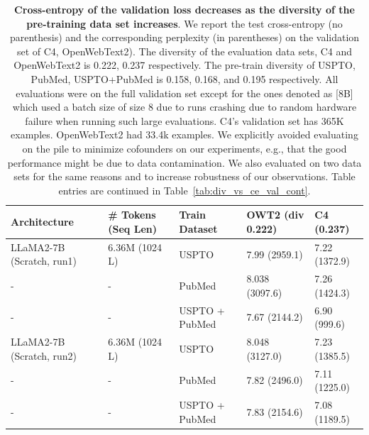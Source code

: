\begin{table}[h]
\caption{\textbf{Cross-entropy of the validation loss decreases as the diversity of the pre-training data set increases}. 
We report the test cross-entropy (no parenthesis) and the corresponding perplexity (in parentheses) on the validation set of C4, OpenWebText2).
The diversity of the evaluation data sets, C4 and OpenWebText2 is 0.222, 0.237 respectively. 
The pre-train diversity of USPTO, PubMed, USPTO+PubMed is 0.158, 0.168, and 0.195 respectively.
All evaluations were on the full validation set except for the ones denoted as [8B] which used a batch size of size 8 due to runs crashing due to random hardware failure when running such large evaluations. 
C4's validation set has 365K examples. 
OpenWebText2 had 33.4k examples. 
We explicitly avoided evaluating on the pile to minimize cofounders on our experiments, e.g., that the good performance might be due to data contamination. 
We also evaluated on two data sets for the same reasons and to increase robustness of our observations. Table entries are continued in Table~\ref{tab:div_vs_ce_val_cont}.
}
\vspace{10pt}
\centering
\begin{tabularx}{1\textwidth}{lXXXX} 
\bottomrule 
Architecture & \# Tokens (Seq Len) & Train Dataset  & OWT2 (\textbf{div 0.222})  & C4 (\textbf{0.237}) \\
\bottomrule 

LLaMA2-7B (Scratch, run1) & 6.36M (1024 L) & USPTO  & 7.99 (2959.1) & 7.22 (1372.9) \\ %
- & - & PubMed & 8.038 (3097.6) & 7.26 (1424.3) \\ %
- & - & USPTO + PubMed & 7.67 (2144.2) & 6.90 (999.6) \\ %
\hline

LLaMA2-7B (Scratch, run2) & 6.36M (1024 L) & USPTO  & 8.048 (3127.0) & 7.23 (1385.5) \\ %
- & - & PubMed & 7.82 (2496.0) & 7.11 (1225.0) \\ %
- & - & USPTO + PubMed & 7.83 (2154.6) & 7.08 (1189.5) \\ %
\hline


\end{tabularx}
\end{table}
